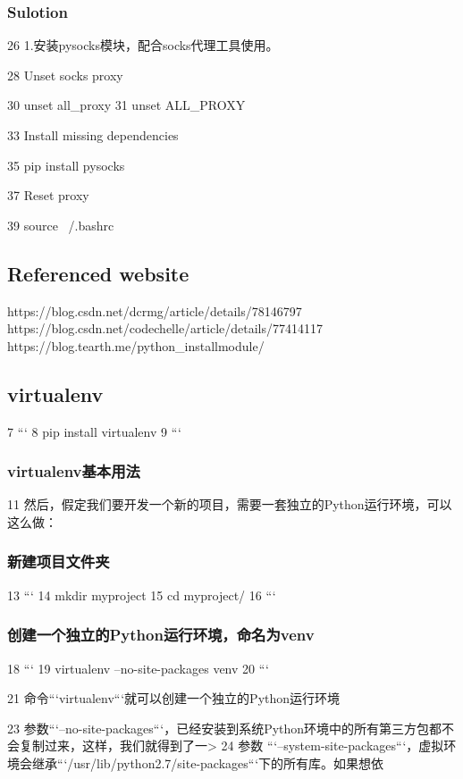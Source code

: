 \documentclass{article} %
\begin{document}
\subsubsection{Sulotion}
 26 1.安装pysocks模块，配合socks代理工具使用。

 28 Unset socks proxy

 30 unset all_proxy
 31 unset ALL_PROXY
 
 33 Install missing dependencies
 
 35 pip install pysocks
 
 37 Reset proxy
 
 39 source ~/.bashrc
 
\subsection{Referenced website}
https://blog.csdn.net/dcrmg/article/details/78146797\\
https://blog.csdn.net/codechelle/article/details/77414117\\
https://blog.tearth.me/python_installmodule/

\subsection{virtualenv}
  7 ```
  8 pip install virtualenv
  9 ```
\subsubsection{virtualenv基本用法}
 11 然后，假定我们要开发一个新的项目，需要一套独立的Python运行环境，可以这么做：
 
\subsubsection{新建项目文件夹}
 
 13 ```
 14 mkdir myproject
 15 cd myproject/
 16 ```

\subsubsection{创建一个独立的Python运行环境，命名为venv}

 18 ```
 19 virtualenv --no-site-packages venv
 20 ```

 21 命令```virtualenv```就可以创建一个独立的Python运行环境

 23 参数```–no-site-packages```，已经安装到系统Python环境中的所有第三方包都不会复制过来，这样，我们就得到了一>
 24 参数 ```–system-site-packages```，虚拟环境会继承```/usr/lib/python2.7/site-packages```下的所有库。如果想依
\end{document}
